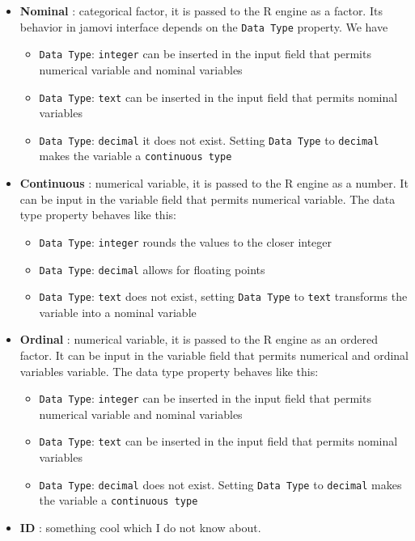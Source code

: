 \documentclass[
]{book}
\providecommand{\tightlist}{%
  \setlength{\itemsep}{0pt}\setlength{\parskip}{0pt}}
\begin{document}
\begin{itemize}
\item
  \textbf{Nominal} : categorical factor, it is passed to the R engine as a factor. Its behavior in jamovi interface depends on the \texttt{Data\ Type} property. We have

  \begin{itemize}
  \tightlist
  \item
    \texttt{Data\ Type}: \texttt{integer} can be inserted in the input field that permits numerical variable and nominal variables
  \item
    \texttt{Data\ Type}: \texttt{text} can be inserted in the input field that permits nominal variables
  \item
    \texttt{Data\ Type}: \texttt{decimal} it does not exist. Setting \texttt{Data\ Type} to \texttt{decimal} makes the variable a \texttt{continuous\ type}
  \end{itemize}
\item
  \textbf{Continuous} : numerical variable, it is passed to the R engine as a number. It can be input in the variable field that permits numerical variable. The data type property behaves like this:

  \begin{itemize}
  \tightlist
  \item
    \texttt{Data\ Type}: \texttt{integer} rounds the values to the closer integer
  \item
    \texttt{Data\ Type}: \texttt{decimal} allows for floating points
  \item
    \texttt{Data\ Type}: \texttt{text} does not exist, setting \texttt{Data\ Type} to \texttt{text} transforms the variable into a nominal variable
  \end{itemize}
\item
  \textbf{Ordinal} : numerical variable, it is passed to the R engine as an ordered factor. It can be input in the variable field that permits numerical and ordinal variables variable. The data type property behaves like this:

  \begin{itemize}
  \tightlist
  \item
    \texttt{Data\ Type}: \texttt{integer} can be inserted in the input field that permits numerical variable and nominal variables
  \item
    \texttt{Data\ Type}: \texttt{text} can be inserted in the input field that permits nominal variables
  \item
    \texttt{Data\ Type}: \texttt{decimal} does not exist. Setting \texttt{Data\ Type} to \texttt{decimal} makes the variable a \texttt{continuous\ type}
  \end{itemize}
\item
  \textbf{ID} : something cool which I do not know about.
\end{itemize}

  
\end{document}
